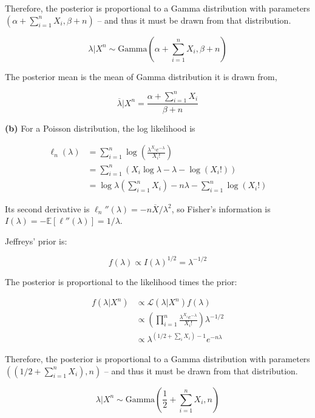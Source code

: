 Therefore, the posterior is proportional to a Gamma distribution with
parameters \(\left(\alpha + \sum_{i=1}^{n} X_{i}, \beta + n\right)\) -- and
thus it must be drawn from that distribution.

\[\lambda | X^{n} \sim \text{Gamma}\left(\alpha + \sum_{i=1}^{n} X_{i}, \beta + n \right)\]

The posterior mean is the mean of Gamma distribution it is drawn from,

\[ \overline{\lambda} | X^{n} = \frac{\alpha + \sum_{i=1}^{n} X_{i}}{\beta + n} \]

\textbf{(b)} For a Poisson distribution, the log likelihood is

\begin{align*}
\ell_{n}(\lambda) &= \sum_{i=1}^{n} \log \left( \frac{\lambda^{X_{i}} e^{-\lambda}}{X_{i}!}\right)  \\
&= \sum_{i=1}^{n} \left( X_{i} \log \lambda - \lambda - \log (X_{i}!)\right) \\
&= \log \lambda \left( \sum_{i=1}^{n} X_{i} \right) - n\lambda - \sum_{i=1}^{n} \log (X_{i}!)
\end{align*}

Its second derivative is
\(\ell_{n}''(\lambda) = -n \overline{X} / \lambda^{2}\), so Fisher's
information is
\(I(\lambda) = -\mathbb{E}[\ell''(\lambda)] = 1 / \lambda\).

Jeffreys' prior is:

\[f(\lambda) \propto I(\lambda)^{1/2} = \lambda^{-1/2}\]

The posterior is proportional to the likelihood times the prior:

\begin{align*}
f(\lambda | X^{n}) &\propto \mathcal{L}(\lambda | X^{n}) f(\lambda) \\
&\propto \left(\prod_{i=1}^{n} \frac{\lambda^{X_{i}}e^{-\lambda}}{X_{i}!} \right) \lambda^{-1/2} \\
&\propto \lambda^{\left(1/2 + \sum_{i} X_{i} \right) - 1} e^{-n\lambda}
\end{align*}

Therefore, the posterior is proportional to a Gamma distribution with
parameters \(\left(\left(1/2 + \sum_{i=1}^{n} X_{i} \right), n\right)\) --
and thus it must be drawn from that distribution.

\[\lambda | X^{n} \sim \text{Gamma}\left(\frac{1}{2} + \sum_{i=1}^{n} X_{i}, n \right)\]
